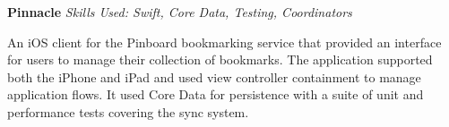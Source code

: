 \textbf{Pinnacle}  \newline
\textit{Skills Used: Swift, Core Data, Testing, Coordinators}

An iOS client for the Pinboard bookmarking service that provided an interface
for users to manage their collection of bookmarks. The application supported
both the iPhone and iPad and used view controller containment to manage
application flows. It used Core Data for persistence with a suite of unit and
performance tests covering the sync system.

